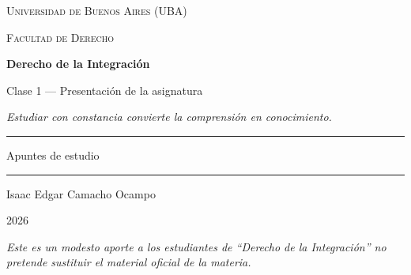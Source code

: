 \documentclass[12pt,oneside]{book}
\newcommand{\universidad}{Universidad de Buenos Aires (UBA)}
\newcommand{\facultad}{Facultad de Derecho}
\newcommand{\materia}{Derecho de la Integración}
\newcommand{\subtitulo}{Clase 1 — Presentación de la asignatura}
\newcommand{\autor}{Isaac Edgar Camacho Ocampo}
\newcommand{\anio}{2026}
\begin{document}

\frontmatter

\begin{titlepage}

\thispagestyle{empty}

\begin{center}

\vspace*{1cm}

{\large \textsc{\universidad}}

\vspace{0.2cm}

{\large \textsc{\facultad}}

\vspace{3cm}

{\Huge \textbf{\materia}}

\vspace{1cm}

{\LARGE \subtitulo}

\vspace{0.8cm}

\textit{Estudiar con constancia convierte la comprensión en conocimiento.}

\vspace{1.2cm}

\rule{0.70\textwidth}{0.5pt}

\vspace{0.5cm}

{\large Apuntes de estudio}

\vspace{0.5cm}

\rule{0.70\textwidth}{0.5pt}

\vfill

{\large \autor}

\vspace{0.3cm}

{\large \anio}

\end{center}

\vfill

\begin{flushleft}
\textit{Este es un modesto aporte a los estudiantes de ``Derecho de la Integración'' no pretende sustituir el material oficial de la materia.}
\end{flushleft}

\end{titlepage}
\end{document}
